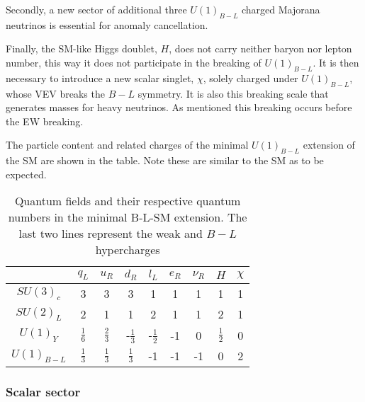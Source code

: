 Secondly, a new sector of additional three $U(1)_{B-L}$ charged Majorana neutrinos is essential for anomaly cancellation. 

Finally, the SM-like Higgs doublet, $H$, does not carry neither baryon nor lepton number, this way it does not participate in the breaking of $U(1)_{B-L}$. It is then necessary to introduce a new scalar singlet, $\chi$, solely charged under $U(1)_{B-L}$, whose VEV breaks the $B-L$ symmetry. It is also this breaking scale that generates masses for heavy neutrinos. As mentioned this breaking occurs before the EW breaking.

The particle content and related charges of the minimal $U(1)_{B-L}$ extension of the SM are shown in the table. Note these are similar to the SM as to be expected. 

\begin{table}[htb!]
\centering
\begin{tabular}{|c|c|c|c|c|c|c|c|c|}
\hline
  & $q_L$  & $u_R$ & $d_R$ & $l_L$  & $e_R$ & $\nu_R$  &  $H$  & $\chi$  \\ \hline
 $SU(3)_c$& 3 & 3 & 3 & 1 & 1 & 1 & 1  & 1  \\
 $SU(2)_L$& 2  & 1 & 1 & 2 & 1 & 1 & 2  & 1 \\
$U(1)_Y$ & $\frac{1}{6}$ & $\frac{2}{3}$  & -$\frac{1}{3}$  & -$\frac{1}{2}$ & -1 & 0 & $\frac{1}{2}$ & 0 \\
$U(1)_{B-L}$ & $\frac{1}{3}$ & $\frac{1}{3}$ & $\frac{1}{3}$  & -1  & -1 &-1  & 0 & 2  \\ \hline 
\end{tabular}
\caption{Quantum fields and their respective quantum numbers in the minimal B-L-SM extension. The last two lines represent the weak and $B-L$ hypercharges}
\label{tab:charges}
\end{table} 

\subsubsection{Scalar sector}

